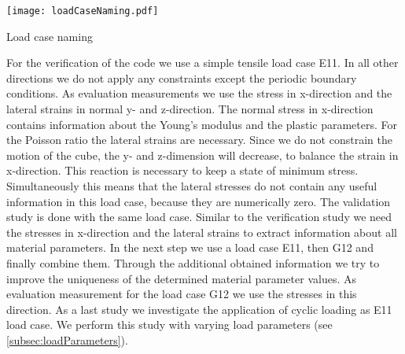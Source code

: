     \begin{table}[H]
        \centering
        \texttt{[image: loadCaseNaming.pdf]}
		\caption{Load case naming}
		\label{tab:loadCaseNaming}
    \end{table}

    For the verification of the code we use a simple tensile load case E11.
    In all other directions we do not apply any constraints except the periodic boundary conditions. As evaluation measurements we use the stress in x-direction and the lateral strains in normal y- and z-direction. The normal stress in x-direction contains information about the Young's modulus and the plastic parameters. For the Poisson ratio the lateral strains are necessary. Since we do not constrain the motion of the cube, the y- and z-dimension will decrease, to balance the strain in x-direction. This reaction is necessary to keep a state of minimum stress. Simultaneously this means that the lateral stresses do not contain any useful information in this load case, because they are numerically zero. 
    The validation study is done with the same load case. Similar to the verification study we need the stresses in x-direction and the lateral strains to extract information about all material parameters. 
    In the next step we use a load case E11, then G12 and finally combine them. Through the additional obtained information we try to improve the uniqueness of the determined material parameter values. As evaluation measurement for the load case G12 we use the stresses in this direction.
    As a last study we investigate the application of cyclic loading as E11 load case. We perform this study with varying load parameters (see \autoref{subsec:loadParameters}). 

